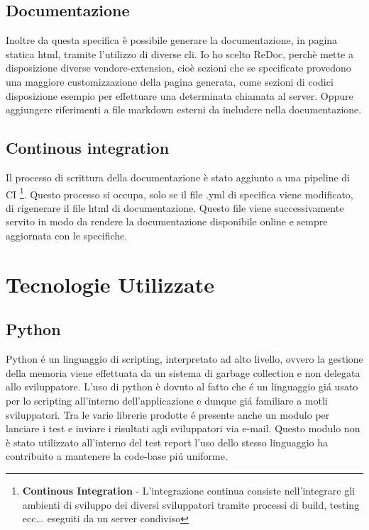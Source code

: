             \subsection{Documentazione\label{apidoc}}
                Inoltre da questa specifica è possibile generare la documentazione, in pagina statica html,
                tramite l'utilizzo di diverse cli.
                Io ho scelto ReDoc, perchè mette a disposizione diverse vendore-extension, cioè sezioni che
                se specificate provedono una maggiore customizzazione della pagina generata, come sezioni di codici disposizione
                esempio per effettuare una determinata chiamata al server.
                Oppure aggiungere riferimenti a file markdown esterni da includere nella documentazione.
                
            \subsection{Continous integration}
                Il processo di scrittura della documentazione è stato aggiunto a una pipeline di CI
                \footnote{\textbf{Continous Integration} - L'integrazione continua consiste nell'integrare gli ambienti di sviluppo dei diversi sviluppatori tramite processi di build, testing ecc... eseguiti da un server condiviso}.
                Questo processo si occupa, solo se il file .yml di specifica viene modificato, di 
                rigenerare il file html di documentazione.
                Questo file viene successivamente servito in modo da rendere la documentazione 
                disponibile online e sempre aggiornata con le specifiche.

    \section{Tecnologie Utilizzate}  
        \subsection{Python}
            Python \'e un linguaggio di scripting, interpretato ad alto livello, ovvero la gestione della memoria viene effettuata da un sistema di garbage collection e non delegata allo sviluppatore.
            L'uso di python è dovuto al fatto che \'e un linguaggio gi\'a usato per lo scripting all'interno dell'applicazione e dunque gi\'a familiare a motli sviluppatori.
            Tra le varie librerie prodotte \'e presente anche un modulo per lanciare i test e inviare i risultati agli sviluppatori via e-mail.
            Questo modulo non è stato utilizzato all'interno del test report l'uso dello stesso linguaggio ha contribuito a mantenere la code-base pi\'u uniforme.

